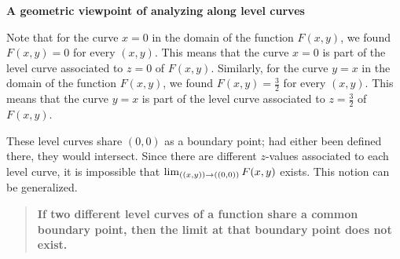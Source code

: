\documentclass{ximera}
\begin{document}
 \textbf{A geometric viewpoint of analyzing along level curves}

\begin{explanation}
Note that for the curve $x=0$ in the domain of the function $F(x,y)$, we found $F(x,y) = 0$ for every $(x,y)$.  This means that the curve $x=0$ is part of the level curve associated to $z=0$ of $F(x,y)$.  Similarly, for the curve $y=x$ in the domain of the function $F(x,y)$, we found $F(x,y) = \frac{3}{2}$ for every $(x,y)$.  This means that the curve $y=x$ is part of the level curve associated to $z= \frac{3}{2}$ of $F(x,y)$.

These level curves share $(0,0)$ as a boundary point; had either been defined there, they would intersect.  Since there are different $z$-values associated to each level curve, it is impossible that $\lim_{\left((x,y)\right) \to \left((0,0)\right)} F(x,y)$ exists.  This notion can be generalized.
\end{explanation}

\begin{quote}
\textbf{If two different level curves of a function share a common boundary point, then the limit at that boundary point does not exist.}
\end{quote} 
 
\end{document}
